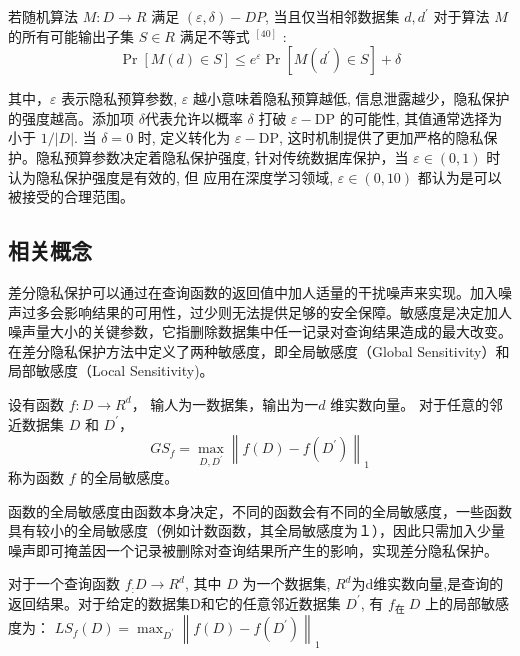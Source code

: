 \begin{define}[成立条件]\label{成立条件}

若随机算法 $M: D \rightarrow R$ 满足 $(\varepsilon, \delta)-D P$, 当且仅当相邻数据集 $d, d^{\prime}$ 对于算法 $M$ 的所有可能输出子集 $S \in R$ 满足不等式 $^{[40]}$ :
$$
\operatorname{Pr}[M(d) \in S] \leq e^{\varepsilon} \operatorname{Pr}\left[M\left(d^{\prime}\right) \in S\right]+\delta
$$

其中，$\varepsilon$ 表示隐私预算参数, $\varepsilon$ 越小意味着隐私预算越低, 信息泄露越少，隐私保护的强度越高。添加项 $\delta$代表允许以概率 $\delta$ 打破 $\varepsilon-\mathrm{DP}$ 的可能性, 其值通常选择为小于 $1 /|D|$. 当 $\delta=0$ 时, 定义转化为 $\varepsilon-\mathrm{DP}$, 这时机制提供了更加严格的隐私保护。隐私预算参数决定着隐私保护强度, 针对传统数据库保护，当 $\varepsilon \in(0,1)$ 时认为隐私保护强度是有效的, 但 应用在深度学习领域, $\varepsilon \in(0,10)$ 都认为是可以被接受的合理范围。

\end{define}

\subsection{相关概念}
差分隐私保护可以通过在查询函数的返回值中加人适量的干扰噪声来实现。加入噪声过多会影响结果的可用性，过少则无法提供足够的安全保障。敏感度是决定加人噪声量大小的关键参数，它指删除数据集中任一记录对查询结果造成的最大改变。 在差分隐私保护方法中定义了两种敏感度，即全局敏感度（Global Sensitivity）和局部敏感度（Local Sensitivity)。

\begin{define}[全局敏感度]\label{全局敏感度}
设有函数 $f: D \rightarrow R^{d}$， 输人为一数据集，输出为一$d$ 维实数向量。 对于任意的邻近数据集 $D$ 和 $D^{\prime}$，
$$
G S_{f}=\max _{D, D^{\prime}}\left\|f(D)-f\left(D^{\prime}\right)\right\|_{1}
$$
称为函数 $f$ 的全局敏感度。
\end{define}

函数的全局敏感度由函数本身决定，不同的函数会有不同的全局敏感度，一些函数具有较小的全局敏感度（例如计数函数，其全局敏感度为１），因此只需加入少量噪声即可掩盖因一个记录被删除对查询结果所产生的影响，实现差分隐私保护。

\begin{define}[局部敏感度]\label{局部敏感度}
对于一个查询函数 $f_{:} D \rightarrow R^{d}$, 其中 $D$ 为一个数据集, $R^{d}$为d维实数向量,是查询的返回结果。对于给定的数据集D和它的任意邻近数据集 $D^{\prime}$, 有 $f_{\text {在 }} D$ 上的局部敏感度为：
$L S_{f}(D)=\max _{D^{\prime}}\left\|f(D)-f\left(D^{\prime}\right)\right\|_{1}$
\end{define}

